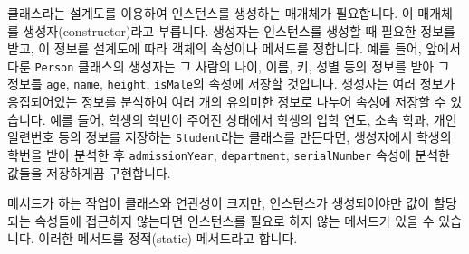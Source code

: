 클래스라는 설계도를 이용하여 인스턴스를 생성하는 매개체가 필요합니다. 이 매개체를 생성자(constructor)라고 부릅니다. 생성자는 인스턴스를 생성할 때 필요한 정보를 받고, 이 정보를 설계도에 따라 객체의 속성이나 메서드를 정합니다. 예를 들어, 앞에서 다룬 \texttt{Person} 클래스의 생성자는 그 사람의 나이, 이름, 키, 성별 등의 정보를 받아 그 정보를 \texttt{age}, \texttt{name}, \texttt{height}, \texttt{isMale}의 속성에 저장할 것입니다. 생성자는 여러 정보가 응집되어있는 정보를 분석하여 여러 개의 유의미한 정보로 나누어 속성에 저장할 수 있습니다. 예를 들어, 학생의 학번이 주어진 상태에서 학생의 입학 연도, 소속 학과, 개인 일련번호 등의 정보를 저장하는 \texttt{Student}라는 클래스를 만든다면, 생성자에서 학생의 학번을 받아 분석한 후 \texttt{admissionYear}, \texttt{department}, \texttt{serialNumber} 속성에 분석한 값들을 저장하게끔 구현합니다. 

메서드가 하는 작업이 클래스와 연관성이 크지만, 인스턴스가 생성되어야만 값이 할당되는 속성들에 접근하지 않는다면 인스턴스를 필요로 하지 않는 메서드가 있을 수 있습니다. 이러한 메서드를 정적(static) 메서드라고 합니다. 
